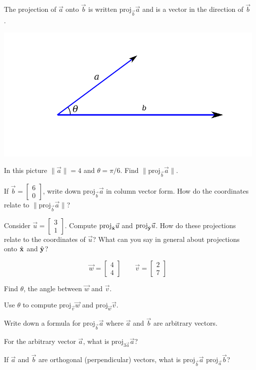 \documentclass{article}
\newcommand{\xh}{\hat{\bf x}}
\newcommand{\yh}{\hat{\bf y}}
\newcommand{\proj}{\mathrm{proj}}
\begin{document}
	The projection of $\vec a$ onto $\vec b$ is written $\proj_{\vec b}\vec a$ and is a vector in the direction of $\vec b$.

	\includegraphics{projection2.pdf}
	
	\begin{Enum}
		\item In this picture $\|\vec a\|=4$ and $\theta = \pi/6$.  Find $\|\proj_{\vec b}\vec a\|$.
		\item If $\vec b=\begin{bmatrix}6\\0\end{bmatrix}$, write down $\proj_{\vec b}\vec a$ in column vector
		form.  How do the coordinates relate to $\|\proj_{\vec b}\vec a\|$?
		\item Consider $\vec u=\begin{bmatrix}3\\1\end{bmatrix}$.  Compute $\proj_{\xh}\vec u$ and 
		$\proj_{\yh}\vec u$.  How do these projections relate to the coordinates of $\vec u$? What
		can you say in general about projections onto $\xh$ and $\yh$?
	\end{Enum}

	\[
		\vec w = \begin{bmatrix}4\\4\end{bmatrix}\qquad \vec v=\begin{bmatrix}2\\7\end{bmatrix}
	\]
	\begin{Enum}
		\item Find $\theta$, the angle between $\vec w$ and $\vec v$.
		\item Use $\theta$ to compute $\proj_{\vec v}\vec w$ and $\proj_{\vec w}\vec v$.
		\item Write down a formula for $\proj_{\vec b}\vec a$ where $\vec a$ and $\vec b$ are
		arbitrary vectors.
	\end{Enum}
	\begin{Enum}
		\item For the arbitrary vector $\vec a$, what is $\proj_{3\vec a}\vec a$?
		\item If $\vec a$ and $\vec b$ are orthogonal (perpendicular) vectors,
		what is $\proj_{\vec b}\vec a$ $\proj_{\vec a}\vec b$?
	\end{Enum}
	
\end{document}
